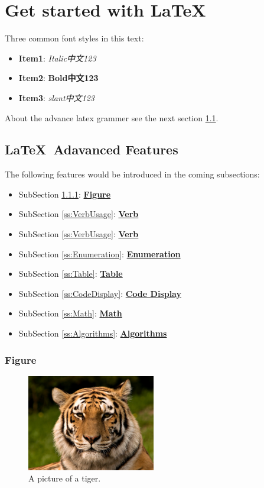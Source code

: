 \chapter{Get started with \LaTeX\ }
\label{c:GetStarted}
Three common font styles in this text: 
\begin{itemize}
    \item \textbf{Item1}: \textit{Italic中文123}     
    \item \textbf{Item2}: \textbf{Bold中文123}
    \item \textbf{Item3}: \textsl{slant中文123}
\end{itemize}

About the advance latex grammer see the next section \ref{s:AdvancedFeatures}.

\section{\LaTeX\ Adavanced Features}
\label{s:AdvancedFeatures}
The following features would be introduced in the coming subsections:
\begin{itemize}
    \item SubSection \ref{ss:Figure}: \hyperref[ss:Figure]{\textbf{Figure}}
    \item SubSection \ref{ss:VerbUsage}: \hyperref[ss:VerbUsage]{\textbf{Verb}}
    \item SubSection \ref{ss:VerbUsage}: \hyperref[ss:VerbUsage]{\textbf{Verb}}
    \item SubSection \ref{ss:Enumeration}: \hyperref[ss:Enumeration]{\textbf{Enumeration}}
    \item SubSection \ref{ss:Table}: \hyperref[ss:Table]{\textbf{Table}}
    \item SubSection \ref{ss:CodeDisplay}: \hyperref[ss:CodeDisplay]{\textbf{Code Display}}
    \item SubSection \ref{ss:Math}: \hyperref[ss:Math]{\textbf{Math}}
    \item SubSection \ref{ss:Algorithms}: \hyperref[ss:Algorithms]{\textbf{Algorithms}}
\end{itemize}

\subsection{Figure}
\label{ss:Figure}
\begin{figure}[htpb!]
  \centering
    \includegraphics[width=0.5\textwidth]{figures/tiger.jpeg}
    \caption{\label{fig:tiger}A picture of a tiger.}
\end{figure}

